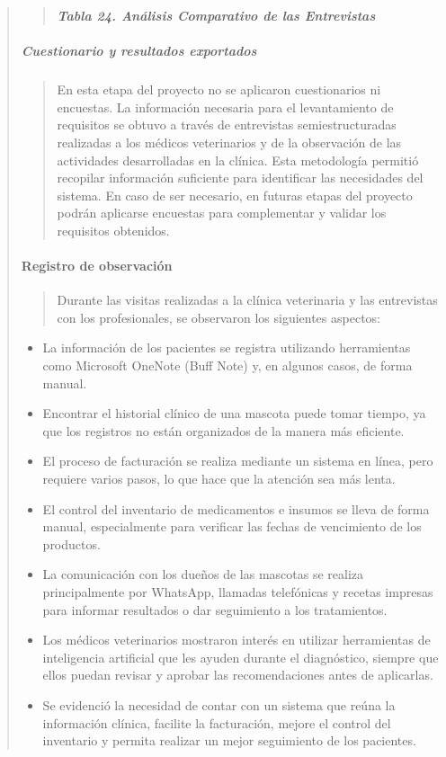 \documentclass[
]{article}
\begin{document}
\begin{quote}
\begin{quote}
\protect{}\label{_bookmark84}{}\emph{\textbf{Tabla 24.
Análisis Comparativo de las Entrevistas}}
\end{quote}

\subparagraph{Cuestionario y resultados
exportados}\label{cuestionario-y-resultados-exportados}

\begin{quote}
En esta etapa del proyecto no se aplicaron cuestionarios ni encuestas.
La información necesaria para el levantamiento de requisitos se obtuvo a
través de entrevistas semiestructuradas realizadas a los médicos
veterinarios y de la observación de las actividades desarrolladas en la
clínica. Esta metodología permitió recopilar información suficiente para
identificar las necesidades del sistema. En caso de ser necesario, en
futuras etapas del proyecto podrán aplicarse encuestas para complementar
y validar los requisitos obtenidos.
\end{quote}

\paragraph{Registro de observación}\label{registro-de-observaciuxf3n}

\begin{quote}
Durante las visitas realizadas a la clínica veterinaria y las
entrevistas con los profesionales, se observaron los siguientes
aspectos:
\end{quote}

\begin{itemize}
\item
  La información de los pacientes se registra utilizando herramientas
  como Microsoft OneNote (Buff Note) y, en algunos casos, de forma
  manual.
\item
  Encontrar el historial clínico de una mascota puede tomar tiempo, ya
  que los registros no están organizados de la manera más eficiente.
\item
  El proceso de facturación se realiza mediante un sistema en línea,
  pero requiere varios pasos, lo que hace que la atención sea más lenta.
\item
  El control del inventario de medicamentos e insumos se lleva de forma
  manual, especialmente para verificar las fechas de vencimiento de los
  productos.
\item
  La comunicación con los dueños de las mascotas se realiza
  principalmente por WhatsApp, llamadas telefónicas y recetas impresas
  para informar resultados o dar seguimiento a los tratamientos.
\item
  Los médicos veterinarios mostraron interés en utilizar herramientas de
  inteligencia artificial que les ayuden durante el diagnóstico, siempre
  que ellos puedan revisar y aprobar las recomendaciones antes de
  aplicarlas.
\item
  Se evidenció la necesidad de contar con un sistema que reúna la
  información clínica, facilite la facturación, mejore el control del
  inventario y permita realizar un mejor seguimiento de los pacientes.
\end{itemize}


\end{quote}
\end{document}
